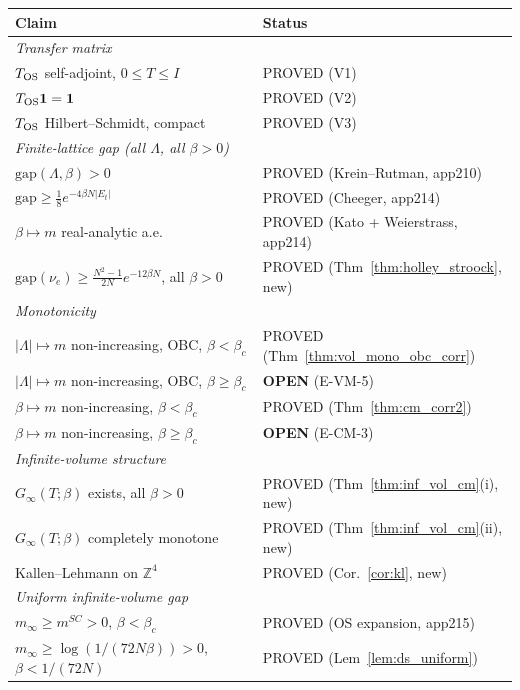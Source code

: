 \begin{center}
\renewcommand{\arraystretch}{1.15}
\begin{tabular}{p{9.5cm}|l}
\hline
\textbf{Claim} & \textbf{Status}\\
\hline
\multicolumn{2}{l}{\textit{Transfer matrix}}\\
$T_{\rm OS}$ self-adjoint, $0\le T\le I$ & PROVED (V1)\\
$T_{\rm OS}\mathbf{1}=\mathbf{1}$ & PROVED (V2)\\
$T_{\rm OS}$ Hilbert--Schmidt, compact & PROVED (V3)\\
\hline
\multicolumn{2}{l}{\textit{Finite-lattice gap (all $\Lambda$, all $\beta>0$)}}\\
$\mathrm{gap}(\Lambda,\beta)>0$ & PROVED (Krein--Rutman, app210)\\
$\mathrm{gap}\ge\frac{1}{8}e^{-4\beta N|E_t|}$ & PROVED (Cheeger, app214)\\
$\beta\mapsto m$ real-analytic a.e. & PROVED (Kato + Weierstrass, app214)\\
$\mathrm{gap}(\nu_e)\ge\frac{N^2-1}{2N}e^{-12\beta N}$, all $\beta>0$ & PROVED (Thm~\ref{thm:holley_stroock}, new)\\
\hline
\multicolumn{2}{l}{\textit{Monotonicity}}\\
$|\Lambda|\mapsto m$ non-increasing, OBC, $\beta<\beta_c$ & PROVED (Thm~\ref{thm:vol_mono_obc_corr})\\
$|\Lambda|\mapsto m$ non-increasing, OBC, $\beta\ge\beta_c$ & \textbf{OPEN} (E-VM-5)\\
$\beta\mapsto m$ non-increasing, $\beta<\beta_c$ & PROVED (Thm~\ref{thm:cm_corr2})\\
$\beta\mapsto m$ non-increasing, $\beta\ge\beta_c$ & \textbf{OPEN} (E-CM-3)\\
\hline
\multicolumn{2}{l}{\textit{Infinite-volume structure}}\\
$G_\infty(T;\beta)$ exists, all $\beta>0$ & PROVED (Thm~\ref{thm:inf_vol_cm}(i), new)\\
$G_\infty(T;\beta)$ completely monotone & PROVED (Thm~\ref{thm:inf_vol_cm}(ii), new)\\
Kallen--Lehmann on $\mathbb{Z}^4$ & PROVED (Cor.~\ref{cor:kl}, new)\\
\hline
\multicolumn{2}{l}{\textit{Uniform infinite-volume gap}}\\
$m_\infty\ge m^{SC}>0$, $\beta<\beta_c$ & PROVED (OS expansion, app215)\\
$m_\infty\ge\log(1/(72N\beta))>0$, $\beta<1/(72N)$ & PROVED (Lem~\ref{lem:ds_uniform})\\

\end{tabular}
\end{center}
